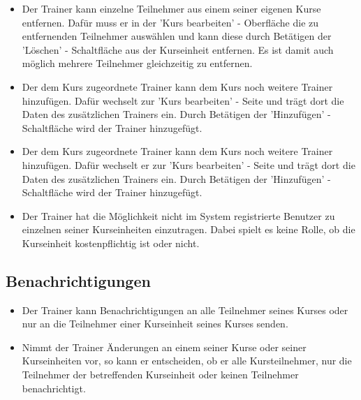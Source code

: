 \documentclass[a4paper]{scrreprt}
\begin{document}
\begin{itemize}
	\item {}
	Der Trainer kann einzelne Teilnehmer aus einem seiner eigenen Kurse entfernen. Dafür muss er in der 'Kurs bearbeiten' - Oberfläche die zu entfernenden Teilnehmer auswählen und kann diese durch Betätigen der 'Löschen' - Schaltfläche aus der Kurseinheit entfernen. Es ist damit auch möglich mehrere Teilnehmer gleichzeitig zu entfernen.
	\item {}
	Der dem Kurs zugeordnete Trainer kann dem Kurs noch weitere Trainer hinzufügen. Dafür wechselt zur 'Kurs bearbeiten' - Seite und trägt dort die Daten des zusätzlichen Trainers ein. Durch Betätigen der 'Hinzufügen' - Schaltfläche wird der Trainer hinzugefügt.
	\item {}
	Der dem Kurs zugeordnete Trainer kann dem Kurs noch weitere Trainer hinzufügen. Dafür wechselt er zur 'Kurs bearbeiten' - Seite und trägt dort die Daten des zusätzlichen Trainers ein. Durch Betätigen der 'Hinzufügen' - Schaltfläche wird der Trainer hinzugefügt.
	\item {}
	Der Trainer hat die Möglichkeit nicht im System registrierte Benutzer zu einzelnen seiner Kurseinheiten einzutragen. Dabei spielt es keine Rolle, ob die Kurseinheit kostenpflichtig ist oder nicht.
\end{itemize}

\subsection{Benachrichtigungen}
\begin{itemize}
	\item {}
	Der Trainer kann Benachrichtigungen an alle Teilnehmer seines Kurses oder nur an die Teilnehmer einer Kurseinheit seines Kurses senden.
	\item {}	
	Nimmt der Trainer Änderungen an einem seiner Kurse oder seiner Kurseinheiten vor, so kann er entscheiden, ob er alle Kursteilnehmer, nur die Teilnehmer der betreffenden Kurseinheit oder keinen Teilnehmer benachrichtigt.
\end{itemize}
\end{document}
